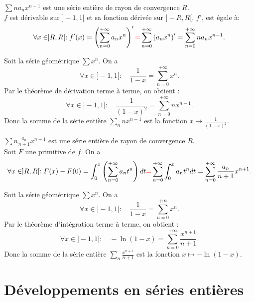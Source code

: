 \documentclass{book}
\begin{document}
\begin{Theoreme}
$\sum n a_n x^{n-1}$ est une série entière de rayon de convergence $R$.\\
$f$ est dérivable sur $]-1,1[$ et sa fonction dérivée  sur $]-R,R[$, $f'$, est égale à:
$$\forall x\in ]R,R[:f'(x)=\left(\sum_{n=0}^{+\infty} a_n x^{n}\right)'{\color{red}{=}}\sum_{n=0}^{+\infty} \left(a_n x^{n}\right)'= \sum_{n=0}^{+\infty}n a_n x^{n-1}.$$
\end{Theoreme}
\begin{Exemple}
Soit la série géométrique $\sum  x^{n}$. On a
$$\forall x\in]-1,1[:\quad \frac{1}{1-x}=\sum_{n=0}^{+\infty}x^n.$$
Par le théorème de dérivation terme à terme, on obtient :
$$\forall x\in]-1,1[:\quad \frac{1}{(1-x)^2}=\sum_{n=0}^{+\infty}nx^{n-1}.$$
Donc la somme de la série entière $\sum_{n}nx^{n-1}$ est la fonction $x\mapsto \frac{1}{(1-x)^2}$.
\end{Exemple}
\begin{Theoreme}
$\sum n \frac{a_n}{n+1} x^{n+1}$ est une série entière de rayon de convergence $R$.\\
Soit $F$ une primitive de $f$. On a 
$$\forall x\in ]R,R[:F(x)-F(0)=\int_0^x \left( \sum_{n=0}^{+\infty} a_n t^{n}\right) dt{\color{red}{=}}\sum_{n=0}^{+\infty} \int_{0}^{x} a_n t^{n}dt= \sum_{n=0}^{+\infty}\frac{a_n}{n+1} x^{n+1}.$$
\end{Theoreme}
\begin{Exemple}
Soit la série géométrique $\sum  x^{n}$. On a
$$\forall x\in]-1,1[:\quad \frac{1}{1-x}=\sum_{n=0}^{+\infty}x^n.$$
Par le théorème d'intégration terme à terme, on obtient :
$$\forall x\in]-1,1[:\quad -\ln(1-x)=\sum_{n=0}^{+\infty}\frac{x^{n+1}}{n+1}.$$
Donc la somme de la série entière $\sum_{n}\frac{x^{n+1}}{n+1}$ est la fonction $x\mapsto -\ln(1-x)$.
\end{Exemple}

\section{Développements en séries entières}
\end{document}
